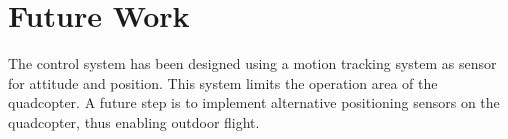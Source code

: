 \section{Future Work}\label{sec:futurework}
The control system has been designed using a motion tracking system as sensor for attitude and position. This system limits the operation area of the quadcopter. A future step is to implement alternative positioning sensors on the quadcopter, thus enabling outdoor flight.


